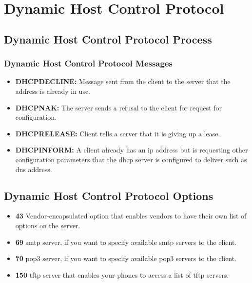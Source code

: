 \chapter[DHCP]{Dynamic Host Control Protocol}

\section[DHCP Process]{Dynamic Host Control Protocol Process}


\subsection[DHCP Messages]{Dynamic Host Control Protocol Messages}

\begin{itemize}
    \item \textbf{DHCPDECLINE:} Message sent from the client to the server that the address is already in use.
    \item \textbf{DHCPNAK:} The server sends a refusal to the client for request for configuration.
    \item \textbf{DHCPRELEASE:} Client tells a server that it is giving up a lease.
    \item \textbf{DHCPINFORM:} A client already has an \gls{ip} address but is requesting other configuration parameters that the \gls{dhcp} server is configured to deliver such as \gls{dns} address.
\end{itemize}

\section[DHCP Options]{Dynamic Host Control Protocol Options}

\begin{itemize}
    \item \textbf{43} Vendor-encapsulated option that enables vendors to have their own list of options on the server.
    \item \textbf{69} \gls{smtp} server, if you want to specify available \gls{smtp} servers to the client.
    \item \textbf{70} \gls{pop3} server, if you want to specify available \gls{pop3} servers to the client.
    \item \textbf{150} \gls{tftp} server that enables your phones to access a list of \gls{tftp} servers.
\end{itemize}

